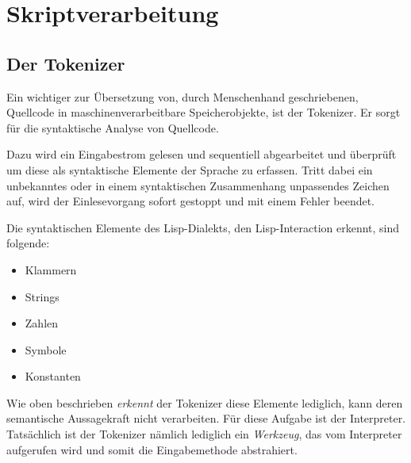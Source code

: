\section{Skriptverarbeitung}

\subsection{Der Tokenizer}
\label{sec:tokenizer}

Ein wichtiger zur Übersetzung von, durch Menschenhand geschriebenen, Quellcode
in maschinenverarbeitbare Speicherobjekte, ist der Tokenizer. Er sorgt für die
syntaktische Analyse von Quellcode.

Dazu wird ein Eingabestrom gelesen und sequentiell abgearbeitet und überprüft
um diese als syntaktische Elemente der Sprache zu erfassen. Tritt dabei ein
unbekanntes oder in einem syntaktischen Zusammenhang unpassendes Zeichen
auf, wird der Einlesevorgang sofort gestoppt und mit einem Fehler beendet.

Die syntaktischen Elemente des Lisp-Dialekts, den Lisp-Interaction erkennt,
sind folgende:

\begin{itemize}
\item{Klammern}
\item{Strings}
\item{Zahlen}
\item{Symbole}
\item{Konstanten}
\end{itemize}

Wie oben beschrieben \emph{erkennt} der Tokenizer diese Elemente lediglich,
kann deren semantische Aussagekraft nicht verarbeiten.
Für diese Aufgabe ist der Interpreter. Tatsächlich ist der Tokenizer nämlich
lediglich ein \emph{Werkzeug}, das vom Interpreter aufgerufen wird und somit
die Eingabemethode abstrahiert.

